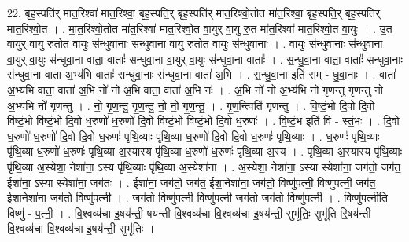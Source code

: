 \documentclass[17pt]{extarticle}
\begin{document}
22. बृह॒स्पति॑र् मात॒रिश्वा॑ मात॒रिश्वा॒ बृह॒स्पति॒र् बृह॒स्पति॑र् मात॒रिश्वो॒तोत मा॑त॒रिश्वा॒ बृह॒स्पति॒र् बृह॒स्पति॑र् मात॒रिश्वो॒त । . मा॒त॒रिश्वो॒तोत मा॑त॒रिश्वा॑ मात॒रिश्वो॒त वा॒युर् वा॒यु रु॒त मा॑त॒रिश्वा॑ मात॒रिश्वो॒त वा॒युः । . उ॒त वा॒युर् वा॒यु रु॒तोत वा॒युः स॑न्धुवा॒नाः स॑न्धुवा॒ना वा॒यु रु॒तोत वा॒युः स॑न्धुवा॒नाः । . वा॒युः स॑न्धुवा॒नाः स॑न्धुवा॒ना वा॒युर् वा॒युः स॑न्धुवा॒ना वाता॒ वाताः᳚ सन्धुवा॒ना वा॒युर् वा॒युः स॑न्धुवा॒ना वाताः᳚ । . स॒न्धु॒वा॒ना वाता॒ वाताः᳚ सन्धुवा॒नाः स॑न्धुवा॒ना वाता॑ अ॒भ्य॑भि वाताः᳚ सन्धुवा॒नाः स॑न्धुवा॒ना वाता॑ अ॒भि । . स॒न्धु॒वा॒ना इति॑ सम् - धु॒वा॒नाः । . वाता॑ अ॒भ्य॑भि वाता॒ वाता॑ अ॒भि नो॑ नो अ॒भि वाता॒ वाता॑ अ॒भि नः॑ । . अ॒भि नो॑ नो अ॒भ्य॑भि नो॑ गृणन्तु गृणन्तु नो अ॒भ्य॑भि नो॑ गृणन्तु । . नो॒ गृ॒ण॒न्तु॒ गृ॒ण॒न्तु॒ नो॒ नो॒ गृ॒ण॒न्तु॒ । . गृ॒ण॒न्त्विति॑ गृणन्तु । . वि॒ष्टं॒भो दि॒वो दि॒वो वि॑ष्टं॒भो वि॑ष्टं॒भो दि॒वो ध॒रुणो॑ ध॒रुणो॑ दि॒वो वि॑ष्टं॒भो वि॑ष्टं॒भो दि॒वो ध॒रुणः॑ । . वि॒ष्टं॒भ इति॑ वि - स्तं॒भः । . दि॒वो ध॒रुणो॑ ध॒रुणो॑ दि॒वो दि॒वो ध॒रुणः॑ पृथि॒व्याः पृ॑थि॒व्या ध॒रुणो॑ दि॒वो दि॒वो ध॒रुणः॑ पृथि॒व्याः । . ध॒रुणः॑ पृथि॒व्याः पृ॑थि॒व्या ध॒रुणो॑ ध॒रुणः॑ पृथि॒व्या अ॒स्यास्य पृ॑थि॒व्या ध॒रुणो॑ ध॒रुणः॑ पृथि॒व्या अ॒स्य । . पृ॒थि॒व्या अ॒स्यास्य पृ॑थि॒व्याः पृ॑थि॒व्या अ॒स्येशा॒ नेशा॑ना॒ ऽस्य पृ॑थि॒व्याः पृ॑थि॒व्या अ॒स्येशा॑ना । . अ॒स्येशा॒ नेशा॑ना॒ ऽस्या स्येशा॑ना॒ जग॑तो॒ जग॑त॒ ईशा॑ना॒ ऽस्या स्येशा॑ना॒ जग॑तः । . ईशा॑ना॒ जग॑तो॒ जग॑त॒ ईशा॒नेशा॑ना॒ जग॑तो॒ विष्णु॑पत्नी॒ विष्णु॑पत्नी॒ जग॑त॒ ईशा॒नेशा॑ना॒ जग॑तो॒ विष्णु॑पत्नी । . जग॑तो॒ विष्णु॑पत्नी॒ विष्णु॑पत्नी॒ जग॑तो॒ जग॑तो॒ विष्णु॑पत्नी । . विष्णु॑प॒त्नीति॒ विष्णु॑ - प॒त्नी॒ । . वि॒श्वव्य॑चा इ॒षय॑न्ती॒ षय॑न्ती वि॒श्वव्य॑चा वि॒श्वव्य॑चा इ॒षय॑न्ती॒ सुभू॑तिः॒ सुभू॑ति रि॒षय॑न्ती वि॒श्वव्य॑चा वि॒श्वव्य॑चा इ॒षय॑न्ती॒ सुभू॑तिः । \newline
\end{document}
